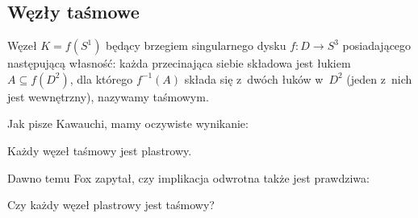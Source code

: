 



\subsection{Węzły taśmowe}
\begin{definition}
    Węzeł $K = f(S^1)$ będący brzegiem singularnego dysku $f \colon D \to S^3$ posiadającego następującą własność: każda przecinająca siebie składowa jest łukiem $A \subseteq f(D^2)$, dla którego $f^{-1}(A)$ składa się z~dwóch łuków w~$D^2$ (jeden z~nich jest wewnętrzny), nazywamy taśmowym.
\end{definition}

Jak pisze Kawauchi, mamy oczywiste wynikanie:

\begin{proposition}
    Każdy węzeł taśmowy jest plastrowy.
\end{proposition}

Dawno temu Fox zapytał, czy implikacja odwrotna także jest prawdziwa:

\begin{conjecture}
    Czy każdy węzeł plastrowy jest taśmowy?
\end{conjecture}

